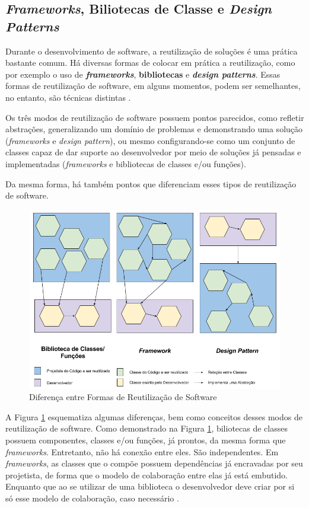 \subsection{\textit{Frameworks}, Biliotecas de Classe e \textit{Design Patterns}}
Durante o desenvolvimento de software, a reutilização de soluções é uma prática bastante comum. Há diversas formas de colocar em prática a reutilização, como por exemplo o uso de \textbf{\textit{frameworks}}, \textbf{bibliotecas} e \textbf{\textit{design patterns}}. Essas formas de reutilização de software, em alguns momentos, podem ser semelhantes, no entanto, são técnicas distintas \cite{barretoJunior2006}.
\par
\indent Os três modos de reutilização de software possuem pontos parecidos, como refletir abstrações, generalizando um domínio de problemas e demonstrando uma solução (\textit{frameworks} e \textit{design pattern}), ou mesmo configurando-se como um conjunto de classes capaz de dar suporte ao desenvolvedor por meio de soluções já pensadas e implementadas (\textit{frameworks} e bibliotecas de classes e/ou funções).
\par
\indent Da mesma forma, há também pontos que diferenciam esses tipos de reutilização de software.
  \begin{figure}[h]
    \centering
    \includegraphics[width=\textwidth]{figuras/bibFrameworkDesignPattern.png}
    \caption{Diferença entre Formas de Reutilização de Software}
    \label{fig:bibFrameworkPattern}
  \end{figure}
\par
\indent A Figura \ref{fig:bibFrameworkPattern} esquematiza algumas diferenças, bem como conceitos desses modos de reutilização de software. Como demonstrado na Figura \ref{fig:bibFrameworkPattern}, biliotecas de classes possuem componentes, classes e/ou funções, já prontos, da mesma forma que \textit{frameworks}. Entretanto, não há conexão entre eles. São independentes. Em \textit{frameworks}, as classes que o compõe possuem dependências já encravadas por seu projetista, de forma que o modelo de colaboração entre elas já está embutido. Enquanto que ao se utilizar de uma biblioteca o desenvolvedor deve criar por si só esse modelo de colaboração, caso necessário \cite{barretoJunior2006}.
